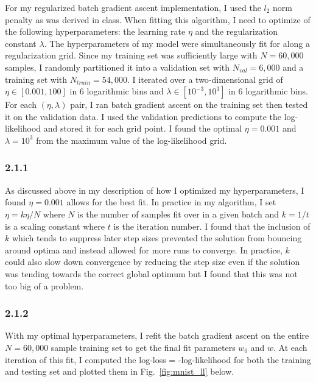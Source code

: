 \documentclass[12pt]{amsart}
\begin{document}
For my regularized batch gradient ascent implementation, I used the $l_2$ norm penalty as was derived in class.  When fitting this algorithm, I need to optimize of the following hyperparameters: the learning rate $\eta$ and the regularization constant $\lambda$.  The hyperparameters of my model were simultaneously fit for along a regularization grid.  Since my training set was sufficiently large with $N = 60,000$ samples, I randomly partitioned it into a validation set with $N_{val} = 6,000$ and a training set with $N_{train} = 54,000$.  I iterated over a two-dimensional grid of $\eta \in [0.001,100]$ in 6 logarithmic bins and $\lambda \in [10^{-3},10^{3}]$ in 6 logarithmic bins.  For each $(\eta,\lambda)$ pair, I ran batch gradient ascent on the training set then tested it on the validation data.  I used the validation predictions to compute the log-likelihood and stored it for each grid point.  I found the optimal $\eta = 0.001$ and $\lambda = 10^3$ from the maximum value of the log-likelihood grid.  

\subsubsection*{2.1.1}

As discussed above in my description of how I optimized my hyperparameters, I found $\eta = 0.001$ allows for the best fit.  In practice in my algorithm, I set $\eta = k\eta/N$ where $N$ is the number of samples fit over in a given batch and $k = 1/t$ is a scaling constant where $t$ is the iteration number.  I found that the inclusion of $k$ which tends to suppress later step sizes prevented the solution from bouncing around optima and instead allowed for more runs to converge.  In practice, $k$ could also slow down convergence by reducing the step size even if the solution was tending towards the correct global optimum but I found that this was not too big of a problem.

\subsubsection*{2.1.2}

With my optimal hyperparameters, I refit the batch gradient ascent on the entire $N = 60,000$ sample training set to get the final fit parameters $w_0$ and $\hat{w}$.  At each iteration of this fit, I computed the log-loss = -log-likelihood for both the training and testing set and plotted them in Fig.~\ref{fig:mnist_ll} below.
\end{document}
